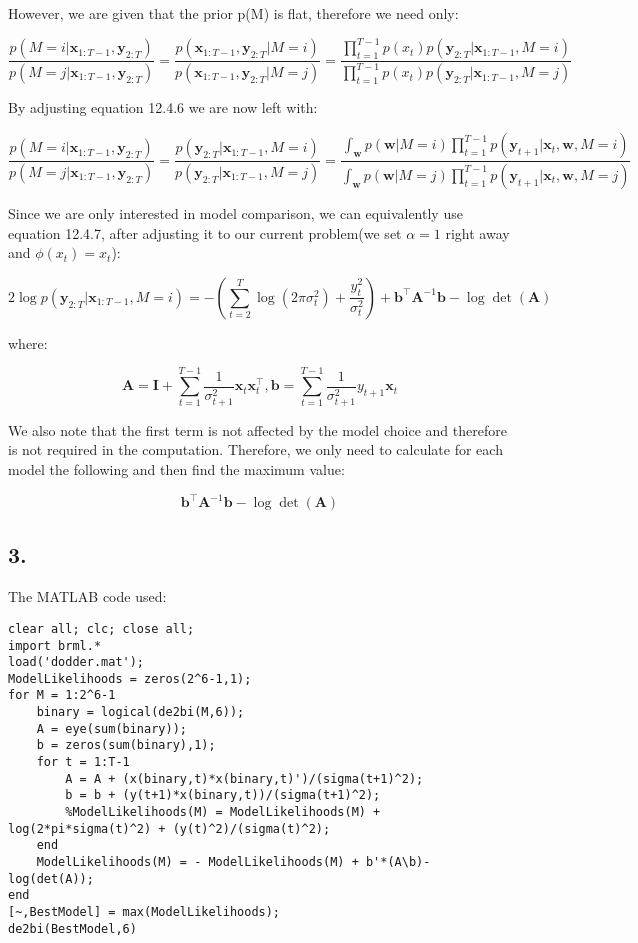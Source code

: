 \documentclass[11pt,a4paper,oneside]{report}
\begin{document}
However, we are given that the prior p(M) is flat, therefore we need only:

$$\frac{p(M=i|\mathbf{x}_{1:T-1},\mathbf{y}_{2:T})}{p(M=j|\mathbf{x}_{1:T-1},\mathbf{y}_{2:T})}=\frac{p(\mathbf{x}_{1:T-1},\mathbf{y}_{2:T}|M=i)}{p(\mathbf{x}_{1:T-1},\mathbf{y}_{2:T}|M=j)}=\frac{\prod_{t=1}^{T-1}p(x_t)p(\mathbf{y}_{2:T}|\mathbf{x}_{1:T-1},M=i)}{\prod_{t=1}^{T-1}p(x_t)p(\mathbf{y}_{2:T}|\mathbf{x}_{1:T-1},M=j)}$$

By adjusting equation 12.4.6 we are now left with:

$$\frac{p(M=i|\mathbf{x}_{1:T-1},\mathbf{y}_{2:T})}{p(M=j|\mathbf{x}_{1:T-1},\mathbf{y}_{2:T})}=\frac{p(\mathbf{y}_{2:T}|\mathbf{x}_{1:T-1},M=i)}{p(\mathbf{y}_{2:T}|\mathbf{x}_{1:T-1},M=j)}=\frac{\int_{\mathbf{w}}p(\mathbf{w}|M=i) \prod_{t=1}^{T-1}p(\mathbf{y}_{t+1}|\mathbf{x}_t,\mathbf{w},M=i)}{\int_{\mathbf{w}}p(\mathbf{w}|M=j) \prod_{t=1}^{T-1}p(\mathbf{y}_{t+1}|\mathbf{x}_t,\mathbf{w},M=j)}$$

Since we are only interested in model comparison, we can equivalently use equation 12.4.7, after adjusting it to our current problem(we set $\alpha = 1$ right away and $\phi(x_t)=x_t$):

$$2\log p(\mathbf{y}_{2:T}|\mathbf{x}_{1:T-1},M=i)=-\left(\sum_{t=2}^{T}\log \left(2\pi\sigma_t^2\right)+\frac{y_t^2}{\sigma_t^2}\right)+\mathbf{b}^\top\mathbf{A}^{-1}\mathbf{b}-\log \det (\mathbf{A})$$

where:

$$\mathbf{A}=\mathbf{I}+\sum_{t=1}^{T-1}\frac{1}{\sigma_{t+1}^2}\mathbf{x}_t\mathbf{x}_t^\top, \mathbf{b}=\sum_{t=1}^{T-1}\frac{1}{\sigma_{t+1}^2}y_{t+1}\mathbf{x}_t$$

We also note that the first term is not affected by the model choice and therefore is not required in the computation. Therefore, we only need to calculate for each model the following and then find the maximum value:

$$\mathbf{b}^\top\mathbf{A}^{-1}\mathbf{b}-\log \det (\mathbf{A})$$

\subsection*{3.}

The MATLAB code used:

\begin{lstlisting}
clear all; clc; close all;
import brml.*
load('dodder.mat');
ModelLikelihoods = zeros(2^6-1,1);
for M = 1:2^6-1
    binary = logical(de2bi(M,6));
    A = eye(sum(binary));
    b = zeros(sum(binary),1);
    for t = 1:T-1
        A = A + (x(binary,t)*x(binary,t)')/(sigma(t+1)^2);
        b = b + (y(t+1)*x(binary,t))/(sigma(t+1)^2);
        %ModelLikelihoods(M) = ModelLikelihoods(M) + log(2*pi*sigma(t)^2) + (y(t)^2)/(sigma(t)^2);
    end
    ModelLikelihoods(M) = - ModelLikelihoods(M) + b'*(A\b)-log(det(A));
end
[~,BestModel] = max(ModelLikelihoods);
de2bi(BestModel,6)
\end{lstlisting}
\end{document}

